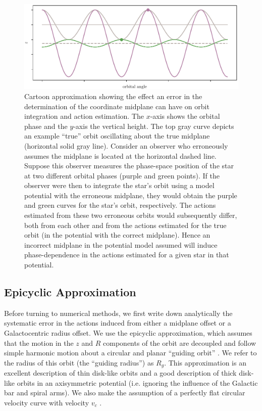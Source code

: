 \documentclass[twocolumn]{aastex62}
\begin{document}
\begin{figure}
\begin{center}
\includegraphics[width=\textwidth]{fig/cartoon.pdf}
\end{center}
\caption{Cartoon approximation showing the effect an error in the
determination of the coordinate midplane can have on orbit integration and
action estimation. The $x$-axis shows the orbital phase and the $y$-axis the
vertical height. The top gray curve depicts an example ``true'' orbit
oscillating about the true midplane (horizontal solid gray line). Consider an
observer who erroneously assumes the midplane is located at the horizontal
dashed line. Suppose this observer measures the phase-space position of the
star at two different orbital phases (purple and green points). If the
observer were then to integrate the star's orbit using a model potential with
the erroneous midplane, they would obtain the purple and green curves for the
star's orbit, respectively. The actions estimated from these two  erroneous
orbits would subsequently differ, both from each other and from the actions
estimated for the true orbit (in the potential with the correct midplane).
Hence an incorrect midplane in the potential model assumed will induce
phase-dependence in the actions estimated for a given star in that potential.}
\label{fig:cartoon}
\end{figure}

\subsection{Epicyclic Approximation} \label{ssec:epi_action}
Before turning to numerical methods, we first write down analytically the
systematic error in the actions induced from either a midplane offset or a
Galactocentric radius offset. We use the epicyclic approximation, which
assumes that the motion in the $z$ and $R$ components of the orbit are
decoupled and follow simple harmonic motion about a circular and planar
``guiding orbit'' \citep[][Section 3.2 and references
therein]{2008gady.book.....B}. We refer to the radius of this orbit (the
``guiding radius'') as $R_g$. This approximation is an excellent description
of thin disk-like orbits and a good description of thick disk-like orbits in
an axisymmetric potential (i.e. ignoring the influence of the Galactic bar and
spiral arms). We also make the assumption of a perfectly flat circular
velocity curve with velocity $v_c$ \citep[decent near the Solar circle,
e.g.][]{2017MNRAS.465...76M}.
\end{document}
